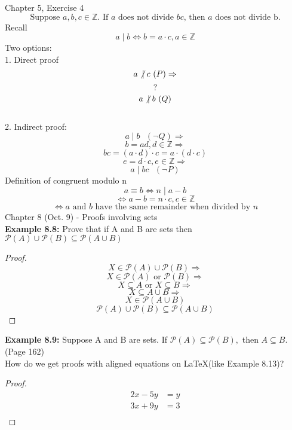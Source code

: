 \documentclass[12pt,fleqn]{article}
\newcommand{\doesnotdivide}{\not\hspace{2.5pt}\mid}
\begin{document}
	Chapter 5, Exercise 4\\
	$$\textrm{Suppose }a,b,c \in \mathbb{Z}. \textrm{ If $a$ does not divide $bc$, then $a$ does not divide b.}$$
	Recall
	$$a\mid b \Leftrightarrow b=a\cdot c,  a\in \mathbb{Z}$$
	Two options:\\
	1. Direct proof\\
	$$a \doesnotdivide c\textrm{ }(P) \Rightarrow$$
	$$?$$
	$$a \doesnotdivide b\textrm{ }(Q)$$\\
	2. Indirect proof:\\
	$$a\mid b\textrm{ }(\neg Q) \Rightarrow$$
	$$b=ad, d \in \mathbb{Z} \Rightarrow$$
	$$bc=(a\cdot d)\cdot c =a\cdot(d\cdot c)$$
	$$e=d\cdot c, e\in \mathbb{Z} \Rightarrow$$
	$$a\mid bc\textrm{ }(\neg P)$$
	Definition of congruent modulo n
	$$a\equiv b \Leftrightarrow n\mid a-b$$
	$$\Leftrightarrow a-b=n\cdot c, c\in \mathbb{Z}$$
	$$\Leftrightarrow \textrm{$a$ and $b$ have the same remainder when divided by $n$}$$
	\noindent Chapter 8 (Oct. 9) - Proofs involving sets\\
	\textbf{Example 8.8:} Prove that if A and B are sets then $\mathscr{P}(A) \cup \mathscr{P}(B)\subseteq \mathscr{P}(A\cup B)$
	\begin{proof}
		$$X \in \mathscr{P}(A) \cup \mathscr{P}(B) \Longrightarrow$$
		$$X\in \mathscr{P}(A)  \textrm{ or } \mathscr{P}(B) \Longrightarrow$$
		$$X\subseteq A \textrm{ or } X\subseteq B \Longrightarrow$$
		$$X \subseteq A \cup B \Longrightarrow$$
		$$X \in \mathscr{P}(A \cup B)$$
		$$\mathscr{P}(A) \cup \mathscr{P}(B) \subseteq \mathscr{P}(A \cup B)$$
	\end{proof}
	\textbf{Example 8.9:} Suppose A and B are sets. If $\mathscr{P}(A) \subseteq \mathscr{P}(B),$ then $A\subseteq B.$
	(Page 162)\\
	\bigskip
	How do we get proofs with aligned equations on \LaTeX (like Example 8.13)?
	\begin{proof}
		\setlength{\mathindent}{5mm}
	\begin{align*}
	2x-5y&=y\\
	3x+9y&=3\\
\end{align*}
	\end{proof}
	

	
	
\end{document}
